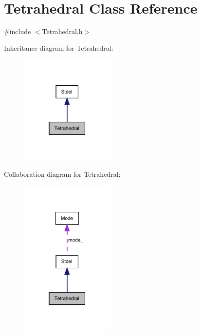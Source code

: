 \hypertarget{classTetrahedral}{}\section{Tetrahedral Class Reference}
\label{classTetrahedral}


{\ttfamily \#include $<$Tetrahedral.\+h$>$}



Inheritance diagram for Tetrahedral\+:
\nopagebreak
\begin{figure}[H]
\begin{center}
\leavevmode
\includegraphics[width=135pt]{classTetrahedral__inherit__graph}
\end{center}
\end{figure}


Collaboration diagram for Tetrahedral\+:
\nopagebreak
\begin{figure}[H]
\begin{center}
\leavevmode
\includegraphics[width=135pt]{classTetrahedral__coll__graph}
\end{center}
\end{figure}
